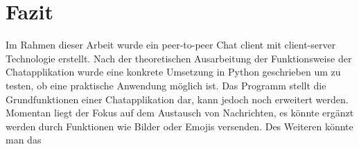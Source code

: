\section{Fazit}
Im Rahmen dieser Arbeit wurde ein peer-to-peer Chat client mit client-server Technologie erstellt. 
Nach der theoretischen Ausarbeitung der Funktionsweise der Chatapplikation wurde eine konkrete Umsetzung in Python geschrieben um zu testen,
ob eine praktische Anwendung möglich ist.
Das Programm stellt die Grundfunktionen einer Chatapplikation dar, kann jedoch noch erweitert werden. 
Momentan liegt der Fokus auf dem Austausch von Nachrichten, es könnte ergänzt werden durch Funktionen wie Bilder oder Emojis versenden.
Des Weiteren könnte man das 
